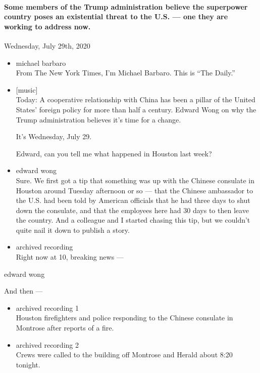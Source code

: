 \hypertarget{some-members-of-the-trump-administration-believe-the-superpower-country-poses-an-existential-threat-to-the-us--one-they-are-working-to-address-now}{%
\paragraph{Some members of the Trump administration believe the
superpower country poses an existential threat to the U.S. --- one they
are working to address
now.}\label{some-members-of-the-trump-administration-believe-the-superpower-country-poses-an-existential-threat-to-the-us--one-they-are-working-to-address-now}}

Wednesday, July 29th, 2020

\begin{itemize}
\item
  michael barbaro\\
  From The New York Times, I'm Michael Barbaro. This is ``The Daily.''
\item
  {[}music{]}\\
  Today: A cooperative relationship with China has been a pillar of the
  United States' foreign policy for more than half a century. Edward
  Wong on why the Trump administration believes it's time for a change.

  It's Wednesday, July 29.

  Edward, can you tell me what happened in Houston last week?
\item
  edward wong\\
  Sure. We first got a tip that something was up with the Chinese
  consulate in Houston around Tuesday afternoon or so --- that the
  Chinese ambassador to the U.S. had been told by American officials
  that he had three days to shut down the consulate, and that the
  employees here had 30 days to then leave the country. And a colleague
  and I started chasing this tip, but we couldn't quite nail it down to
  publish a story.
\item
  archived recording\\
  Right now at 10, breaking news ---
\end{itemize}

edward wong

And then ---

\begin{itemize}
\item
  archived recording 1\\
  Houston firefighters and police responding to the Chinese consulate in
  Montrose after reports of a fire.
\item
  archived recording 2\\
  Crews were called to the building off Montrose and Herald about 8:20
  tonight.
\end{itemize}

